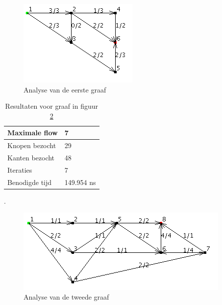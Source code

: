 \begin{figure}[h]
	\includegraphics{breadthfirst/bfsgraph1}
	\centering
	\caption{Analyse van de eerste graaf}
	\label{fig:BFSgraph1}
\end{figure}

\begin{table}[h]
 \begin{tabularx}{\linewidth}{| l | X |}
 \hline
 Maximale flow & 7 \\
 \hline
 Knopen bezocht & 29 \\
 \hline
 Kanten bezocht & 48 \\
 \hline
 Iteraties & 7 \\
 \hline
 Benodigde tijd & 149.954 ns \\
 \hline
\end{tabularx}
\centering
\caption{Resultaten voor graaf in figuur \ref{fig:BFSgraph2}}.
\label{tbl:BFSgraph2}
\end{table}

\begin{figure}[h]
	\includegraphics{breadthfirst/bfsgraph2}
	\centering
	\caption{Analyse van de tweede graaf}
	\label{fig:BFSgraph2}
\end{figure}